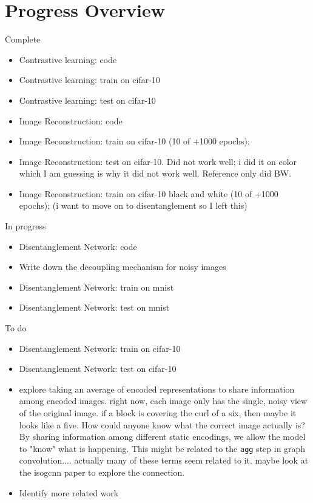 \documentclass[11pt]{article}
\begin{document}
\section{Progress Overview}

Complete

\begin{itemize}
\item Contrastive learning: code
\item Contrastive learning: train on cifar-10
\item Contrastive learning: test on cifar-10
\item Image Reconstruction: code
\item Image Reconstruction: train on cifar-10  (10 of +1000 epochs); 
\item Image Reconstruction: test on cifar-10. Did not work well; i did it on color which I am guessing is why it did not work well. Reference only did BW.
\item Image Reconstruction: train on cifar-10 black and white  (10 of +1000 epochs); (i want to move on to disentanglement so I left this)
\end{itemize}

In progress

\begin{itemize}
\item Disentanglement Network: code
\item Write down the decoupling mechanism for noisy images
\item Disentanglement Network: train on mnist
\item Disentanglement Network: test on mnist
\end{itemize}


To do

\begin{itemize}
\item Disentanglement Network: train on cifar-10
\item Disentanglement Network: test on cifar-10
\item explore taking an average of encoded representations to share information among encoded images. right now, each image only has the single, noisy view of the original image. if a block is covering the curl of a six, then maybe it looks like a five. How could anyone know what the correct image actually is? By sharing information among different static encodings, we allow the model to "know" what is happening. This might be related to the {\tt agg} step in graph convolution.... actually many of these terms seem related to it. maybe look at the isogcnn paper to explore the connection.
\item Identify more related work
\end{itemize}
\end{document}
